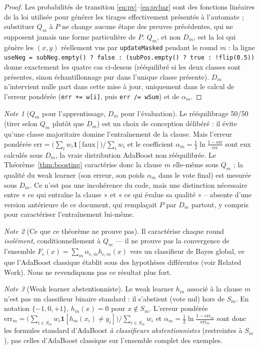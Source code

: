 \documentclass[12pt,a4paper]{article}
\theoremstyle{remark}
\newtheorem{note}{Note}[section]
\begin{document}
\begin{proof}
Les probabilités de transition \eqref{eq:pv}--\eqref{eq:pvbar} sont des
fonctions linéaires de la loi utilisée pour générer les tirages effectivement
présentés à l'automate ; substituer $Q_m$ à $P$ ne change aucune étape des
preuves précédentes, qui ne supposent jamais une forme particulière de $P$.
$Q_m$, et non $D_m$, est la loi qui génère les $(x,y)$ réellement vus par
\texttt{updateMasked} pendant le round $m$ : la ligne
\texttt{useNeg = subNeg.empty() ? false : (subPos.empty() ? true : !flip(0.5))}
donne exactement les quatre cas ci-dessus (rééquilibré si les deux classes sont
présentes, sinon échantillonnage pur dans l'unique classe présente). $D_m$
n'intervient nulle part dans cette mise à jour, uniquement dans le calcul de
l'erreur pondérée (\texttt{err += w[i]}, puis \texttt{err /= wSum}) et de
$\alpha_m$.
\end{proof}

\begin{note}[$Q_m$ pour l'apprentissage, $D_m$ pour l'évaluation]
Le rééquilibrage 50/50 (tirer selon $Q_m$ plutôt que $D_m$) est un choix de
conception délibéré : il évite qu'une classe majoritaire domine l'entraînement
de la clause. Mais l'erreur pondérée
$\mathrm{err}=\bigl(\sum_i w_i\mathbf 1[\text{faux}]\bigr)/\sum_i w_i$ et le
coefficient $\alpha_m=\tfrac12\ln\frac{1-\mathrm{err}}{\mathrm{err}}$ sont eux
calculés sous $D_m$, la vraie distribution AdaBoost non rééquilibrée. Le
Théorème~\ref{thm:boosting} caractérise donc la clause $m$ elle-même sous
$Q_m$ ; la qualité du weak learner (son erreur, son poids $\alpha_m$ dans le
vote final) est mesurée sous $D_m$. Ce n'est pas une incohérence du code, mais
une distinction nécessaire entre « ce qui entraîne la clause » et « ce qui
évalue sa qualité » -- absente d'une version antérieure de ce document, qui
remplaçait $P$ par $D_m$ partout, y compris pour caractériser l'entraînement
lui-même.
\end{note}

\begin{note}[Ce que ce théorème ne prouve pas]
Il caractérise chaque round \emph{isolément}, conditionnellement à $Q_m$ ---
il ne prouve pas la convergence de l'ensemble $F_c(x)=\sum_m
\alpha_{c,m}h_{c,m}(x)$ vers un classifieur de Bayes global, ce que
l'AdaBoost classique établit sous des hypothèses différentes (voir Related
Work). Nous ne revendiquons pas ce résultat plus fort.
\end{note}

\begin{note}[Weak learner abstentionniste]
Le weak learner $h_m$ associé à la clause $m$ n'est pas un classifieur binaire
standard : il s'abstient (vote nul) hors de $S_m$. En notation $\{-1,0,+1\}$,
$h_m(x)=0$ pour $x\notin S_m$. L'erreur pondérée
$\mathrm{err}_m=\bigl(\sum_{i\in S_m}w_i\mathbf1[h_m(x_i)\ne y_i]\bigr)/\sum_{i\in S_m}w_i$
et $\alpha_m=\tfrac12\ln\frac{1-\mathrm{err}_m}{\mathrm{err}_m}$ sont donc les
formules standard d'AdaBoost \emph{à classifieurs abstentionnistes}
(restreintes à $S_m$), pas celles d'AdaBoost classique sur l'ensemble complet
des exemples.
\end{note}
\end{document}
